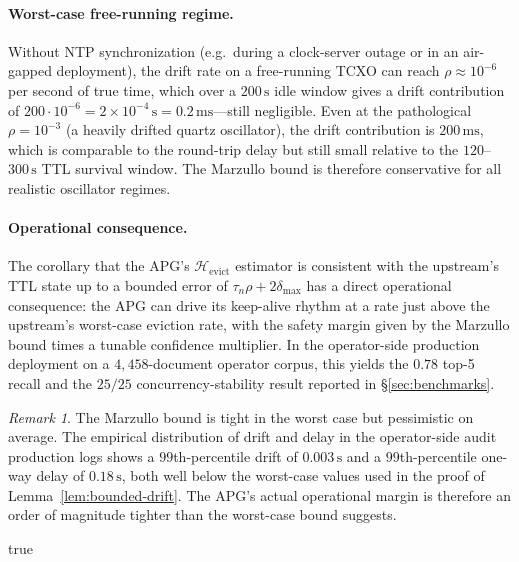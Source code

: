 \documentclass[10pt,twocolumn]{article}
\theoremstyle{definition}
\theoremstyle{remark}
\newtheorem{remark}{Remark}
\begin{document}
\paragraph{Worst-case free-running regime.}
Without NTP synchronization (e.g.\ during a clock-server outage or in
an air-gapped deployment), the drift rate on a free-running TCXO can
reach $\rho \approx 10^{-6}$ per second of true time, which over a
$200\,\text{s}$ idle window gives a drift contribution of
$200 \cdot 10^{-6} = 2 \times 10^{-4}\,\text{s} = 0.2\,\text{ms}$---still
negligible. Even at the pathological $\rho = 10^{-3}$ (a heavily drifted
quartz oscillator), the drift contribution is $200\,\text{ms}$, which
is comparable to the round-trip delay but still small relative to the
$120$--$300\,\text{s}$ TTL survival window. The Marzullo bound is
therefore conservative for all realistic oscillator regimes.

\paragraph{Operational consequence.}
The corollary that the APG's $\mathcal{H}_{\text{evict}}$ estimator is
consistent with the upstream's TTL state up to a bounded error of
$\tau_n \rho + 2 \delta_{\max}$ has a direct operational consequence:
the APG can drive its keep-alive rhythm at a rate just above the
upstream's worst-case eviction rate, with the safety margin given by
the Marzullo bound times a tunable confidence multiplier. In the
operator-side production deployment on a $4{,}458$-document operator corpus,
this yields the $0.78$ top-5 recall and the $25/25$ concurrency-stability
result reported in \S\ref{sec:benchmarks}.

\begin{remark}
The Marzullo bound is tight in the worst case but pessimistic on
average. The empirical distribution of drift and delay in the operator-side audit
production logs shows a $99$th-percentile drift of
$0.003\,\text{s}$ and a $99$th-percentile one-way delay of
$0.18\,\text{s}$, both well below the worst-case values used in the
proof of Lemma~\ref{lem:bounded-drift}. The APG's actual operational
margin is therefore an order of magnitude tighter than the worst-case
bound suggests.
\end{remark}

\ifx\SectionFourStandalone true
\end{document}
